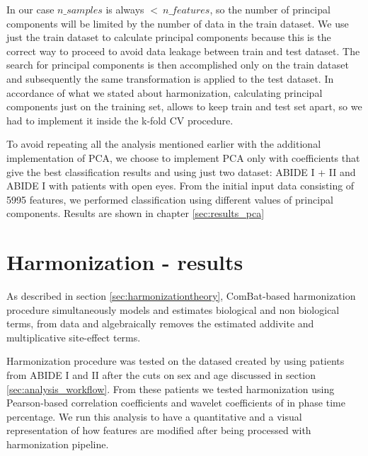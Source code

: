 \documentclass[11pt]{report}
\begin{document}
In our case $n\_samples$ is always $< \ n\_features$, so the number of principal components will be limited by the number of data in the train dataset.
We use just the train dataset to calculate principal components because this is the correct way to proceed to avoid data leakage between train and test dataset.
The search for principal components is then accomplished only on the train dataset and subsequently the same transformation is applied to the test dataset.
In accordance of what we stated about harmonization, calculating principal components just on the training set, allows to keep train and test set apart, so we had to implement it inside the k-fold CV procedure.


To avoid repeating all the analysis mentioned earlier with the additional implementation of PCA, we choose to implement PCA only with coefficients that give the best classification results and using just two dataset: ABIDE I + II and ABIDE I with patients with open eyes.
From the initial input data consisting of 5995 features, we performed classification using different values of principal components.
Results are shown in chapter \ref{sec:results_pca}



\chapter{Harmonization - results}\label{chap:harmonization_results}

As described in section \ref{sec:harmonizationtheory}, ComBat-based harmonization procedure simultaneously models and estimates biological and non biological terms, from data and algebraically removes the estimated addivite and multiplicative site-effect terms.

Harmonization procedure was tested on the datased created by using patients from ABIDE I and II after the cuts on sex and age discussed in section \ref{sec:analysis_workflow}.
From these patients we tested harmonization using Pearson-based correlation coefficients and wavelet coefficients of in phase time percentage.
We run this analysis to have a quantitative and a visual representation of how features are modified after being processed with harmonization pipeline.
\end{document}
